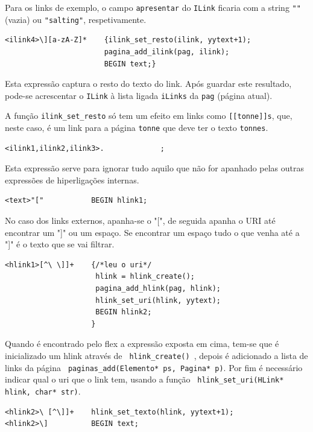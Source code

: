 \documentclass[11pt, a4paper, oneside]{article}
\begin{document}
Para os links de exemplo, o campo \texttt{apresentar} do \texttt{ILink} ficaria com a string \texttt{""} (vazia) ou \texttt{"salting"}, respetivamente.

\begin{verbatim}
<ilink4>\][a-zA-Z]*    {ilink_set_resto(ilink, yytext+1);
                       pagina_add_ilink(pag, ilink);
                       BEGIN text;}
\end{verbatim}

Esta expressão captura o resto do texto do link. Após guardar este resultado, pode-se acrescentar o \texttt{ILink} à lista ligada \texttt{iLinks} da \texttt{pag} (página atual).

A função \texttt{ilink\_set\_resto} só tem um efeito em links como \texttt{[[tonne]]s}, que, neste caso, é um link para a página \texttt{tonne} que deve ter o texto \texttt{tonnes}.


\begin{verbatim}
<ilink1,ilink2,ilink3>.             ;
\end{verbatim}

Esta expressão serve para ignorar tudo aquilo que não for apanhado pelas outras expressões de hiperligações internas.


\begin{verbatim}
<text>"["           BEGIN hlink1;
\end{verbatim}

No caso dos links externos, apanha-se o "[", de seguida apanha o URI até encontrar um "]" ou um espaço. Se encontrar um espaço tudo o que venha até a "]"  é o texto que se vai filtrar.
\begin{verbatim}
<hlink1>[^\ \]]+    {/*leu o uri*/
                     hlink = hlink_create();
                     pagina_add_hlink(pag, hlink);
                     hlink_set_uri(hlink, yytext);
                     BEGIN hlink2;
                    }
\end{verbatim}

Quando é  encontrado pelo flex a expressão exposta em cima, tem-se que é inicializado um hlink através de \texttt{ hlink\_create() }, depois é adicionado a lista de links da página  \texttt{ paginas\_add(Elemento* ps, Pagina* p)}. Por fim  é necessário indicar qual o uri que o link tem, usando a função  \texttt{ hlink\_set\_uri(HLink* hlink, char* str)}.

\begin{verbatim}
<hlink2>\ [^\]]+    hlink_set_texto(hlink, yytext+1);
<hlink2>\]          BEGIN text;
\end{verbatim}
\end{document}
